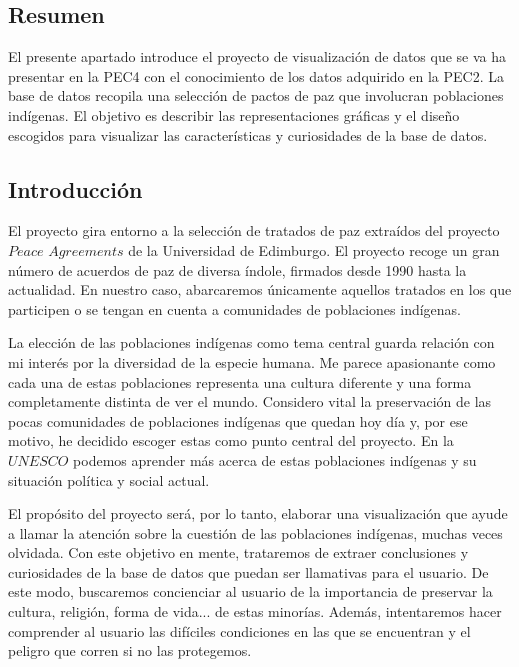\documentclass[11pt]{article}
\begin{document}
\subsection{Resumen}

El presente apartado introduce el proyecto de visualización de datos que se va ha presentar en la PEC4 con el conocimiento de los datos adquirido en la PEC2. La base de datos recopila una selección de pactos de paz que involucran poblaciones indígenas. El objetivo es describir las representaciones gráficas y el diseño escogidos para  visualizar las características y curiosidades de la base de datos.

\subsection{Introducción}

 El proyecto gira entorno a la selección de tratados de paz extraídos del proyecto $\textit{Peace Agreements}$ \cite{peace} de la Universidad de Edimburgo. El proyecto recoge un gran número de acuerdos de paz de diversa índole, ﬁrmados desde 1990 hasta la actualidad. En nuestro caso, abarcaremos únicamente aquellos tratados en los que participen o se tengan en cuenta a comunidades de poblaciones indígenas. 

La elección de las poblaciones indígenas como tema central guarda relación con mi interés por la diversidad de la especie humana. Me parece apasionante como cada una de estas poblaciones representa una cultura diferente y una forma completamente distinta de ver el mundo. Considero vital la preservación de las pocas comunidades de poblaciones indígenas que quedan hoy día y, por ese motivo, he decidido escoger estas como punto central del proyecto. En la $\textit{UNESCO}$ \cite{unesco} podemos aprender más acerca de estas poblaciones indígenas y su situación política y social actual.

El propósito del proyecto será, por lo tanto, elaborar una visualización que ayude a llamar la atención sobre la cuestión de las poblaciones indígenas, muchas veces olvidada. Con este objetivo en mente, trataremos de extraer conclusiones y curiosidades de la base de datos que puedan 
ser llamativas para el usuario. De este modo, buscaremos concienciar al usuario de la importancia de preservar la cultura, religión, forma de vida... de estas minorías. Además, intentaremos hacer comprender al usuario las difíciles condiciones en las que se encuentran y el peligro que corren si no las protegemos. 
\end{document}
